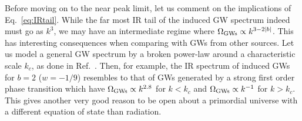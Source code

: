 \documentclass[a4paper,11pt]{article}
\numberwithin{equation}{section}
\begin{document}
Before moving on to the near peak limit, let us comment on the implications of Eq.~\eqref{eq:IRtail}. While the far most IR tail of the induced GW spectrum indeed must go as $k^3$, we may have an intermediate regime where $\Omega_{\rm GWs}\propto  k^{3-2|b|}$. This has interesting consequences when comparing with GWs from other sources. Let us model a general GW spectrum by a broken power-law around a characteristic scale $k_c$, as done in Ref.~\cite{Kuroyanagi:2018csn}. Then, for example, the IR spectrum of induced GWs for $b=2$ ($w=-1/9$) resembles to that of GWs generated by a strong first order phase transition which have $\Omega_{\rm GWs}\propto  k^{2.8}$ for $k<k_c$ and $\Omega_{\rm GWs}\propto  k^{-1}$ for $k>k_c$. This gives another very good reason to be open about a primordial universe with a different equation of state than radiation.
\end{document}
